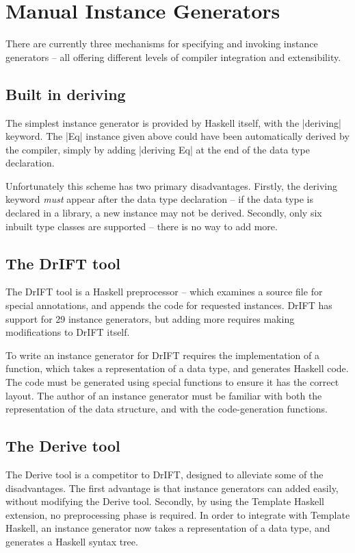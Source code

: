 \documentclass{llncs}
\begin{document}
\section{Manual Instance Generators}
\label{sec:manual_instances}

There are currently three mechanisms for specifying and invoking instance generators -- all offering different levels of compiler integration and extensibility.

\subsection{Built in deriving}

The simplest instance generator is provided by Haskell itself, with the |deriving| keyword. The |Eq| instance given above could have been automatically derived by the compiler, simply by adding |deriving Eq| at the end of the data type declaration.
 
Unfortunately this scheme has two primary disadvantages. Firstly, the deriving keyword \textit{must} appear after the data type declaration -- if the data type is declared in a library, a new instance may not be derived. Secondly, only six inbuilt type classes are supported -- there is no way to add more.

\subsection{The DrIFT tool}

The DrIFT tool \cite{drift} is a Haskell preprocessor -- which examines a source file for special annotations, and appends the code for requested instances. DrIFT has support for 29 instance generators, but adding more requires making modifications to DrIFT itself.

To write an instance generator for DrIFT requires the implementation of a function, which takes a representation of a data type, and generates Haskell code. The code must be generated using special functions to ensure it has the correct layout. The author of an instance generator must be familiar with both the representation of the data structure, and with the code-generation functions.

\subsection{The Derive tool}

The Derive tool \cite{derive} is a competitor to DrIFT, designed to alleviate some of the disadvantages. The first advantage is that instance generators can added easily, without modifying the Derive tool. Secondly, by using the Template Haskell \cite{template_haskell} extension, no preprocessing phase is required. In order to integrate with Template Haskell, an instance generator now takes a representation of a data type, and generates a Haskell syntax tree.
\end{document}
